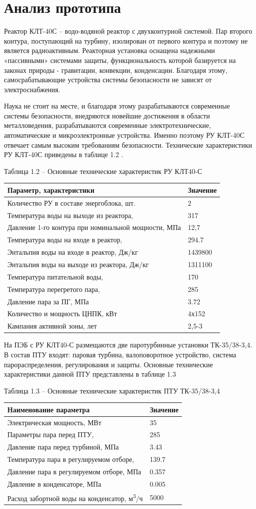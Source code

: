 \section{Анализ прототипа}

Реактор КЛТ-40С -- водо-водяной реактор с двухконтурной системой. Пар
второго контура, поступающий на турбину, изолирован от первого контура и
поэтому не является радиоактивным. Реакторная установка оснащена
надежными «пассивными» системами защиты, функциональность которой
базируется на законах природы - гравитации, конвекции, конденсации.
Благодаря этому, самосрабатывающие устройства системы безопасности не
зависят от электроснабжения.

Наука не стоит на месте, и благодаря этому разрабатываются современные
системы безопасности, внедряются новейшие достижения в области
металловедения, разрабатываются современные электротехнические,
автоматические и микроэлектронные устройства. Именно поэтому РУ КЛТ-40С
отвечает самым высоким требованиям безопасности. Технические
характеристики РУ КЛТ-40С приведены в таблице 1.2 \cite{deev}.

Таблица 1.2 -- Основные технические характеристик РУ КЛТ40-С

\begin{longtable}[]{@{}|l|l|@{}}
\toprule
Параметр, характеристики & Значение\tabularnewline
\midrule
\endhead
Количество РУ в составе энергоблока, шт. & 2\tabularnewline
Температура воды на выходе из реактора, \(\) & 317\tabularnewline
Давление 1-го контура при номинальной мощности, МПа &
12,7\tabularnewline
Температура воды на входе в реактор, \(\) & 294.7\tabularnewline
Энтальпия воды на входе в реактор, Дж/кг & 1439800\tabularnewline
Энтальпия воды на выходе из реактора, Дж/кг & 1311100\tabularnewline
Температура питательной воды, \(\) & 170\tabularnewline
Температура перегретого пара,\(\ \) & 285\tabularnewline
Давление пара за ПГ, МПа & 3.72\tabularnewline
Количество и мощность ЦНПК, кВт & 4х152\tabularnewline
Кампания активной зоны, лет & 2,5-3\tabularnewline
\bottomrule
\end{longtable}

На ПЭБ с РУ КЛТ40-С размещаются две паротурбинные установки
ТК-35/38-3,4. В состав ПТУ входят: паровая турбина, валоповоротное
устройство, система парораспределения, регулирования и защиты. Основные
технические характеристики данной ПТУ представлены в таблице 1.3
\cite{deev}

Таблица 1.3 -- Основные технические характеристик ПТУ ТК-35/38-3,4


\begin{longtable}[]{@{}|l|l|@{}}
\toprule
Наименование параметра & Значение\tabularnewline
\midrule
\endhead
Электрическая мощность, МВт & 35\tabularnewline
Параметры пара перед ПТУ,\(\ \) & 285\tabularnewline
Давление пара перед турбиной, МПа & 3.43\tabularnewline
Температура пара в регулируемом отборе, \(\) & 139.7\tabularnewline
Давление пара в регулируемом отборе, МПа & 0.357\tabularnewline
Давление в конденсаторе, МПа & 0.005\tabularnewline
Расход забортной воды на конденсатор, м\textsuperscript{3}/ч &
5000\tabularnewline
\bottomrule
\end{longtable}

